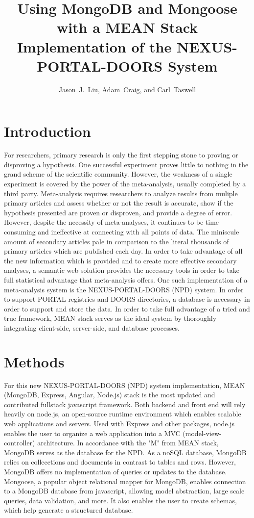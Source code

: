 \documentclass[10pt,twocolumn,twoside]{article}
\date{} %
\author{Jason~J.~Liu, Adam~Craig, and Carl~Taswell}
\title{Using MongoDB and Mongoose with a MEAN Stack Implementation of the NEXUS-PORTAL-DOORS System\\ }
\begin{document}
\maketitle
\thispagestyle{empty}

\section*{Introduction}
\label{secIntroduction}
	For researchers, primary research is only the first stepping stone to proving or disproving a hypothesis. One successful experiment proves little to nothing in the grand scheme of the scientific community. However, the weakness of a single experiment is covered by the power of the meta-analysis, usually completed by a third party. Meta-analysis requires researchers to analyze results from muliple primary articles and assess whether or not the result is accurate, show if the hypothesis presented are proven or disproven, and provide a degree of error. However, despite the necessity of meta-analyses, it continues to be time consuming and ineffective at connecting with all points of data. The miniscule amount of secondary articles pale in comparison to the literal thousands of primary articles which are published each day. In order to take advantage of all the new information which is provided and to create more effective secondary analyses, a semantic web solution provides the necessary tools in order to take full statistical advantage that meta-analysis offers. 
 \newline
	One such implementation of a meta-analysis system is the NEXUS-PORTAL-DOORS (NPD) system. In order to support PORTAL registries and DOORS directories, a database is necessary in order to support and store the data. In order to take full advantage of a tried and true framework, MEAN stack serves as the ideal system by thoroughly integrating client-side, server-side, and database processes. 

\section*{Methods}
\label{secMethods}
	For this new NEXUS-PORTAL-DOORS (NPD) system implementation, MEAN (MongoDB, Express, Angular, Node.js)  stack is the most updated and contributed fullstack javascript framework. Both backend and front end will rely heavily on node.js, an open-source runtime environment which enables scalable web applications and servers. Used with Express and other packages, node.js enables the user to organize a web application into a MVC (model-view-controller) architecture. In accordance with the "M" from MEAN stack, MongoDB serves as the database for the NPD. As a noSQL database, MongoDB relies on collecetions and documents in contrast to tables and rows. However, MongoDB offers no implementation of queries or updates to the database. Mongoose, a popular object relational mapper for MongoDB, enables connection to a MongoDB database from javascript, allowing model abstraction, large scale queries, data validation, and more. It also enables the user to create schemas, which help generate a structured database. \newline
	
\end{document}
